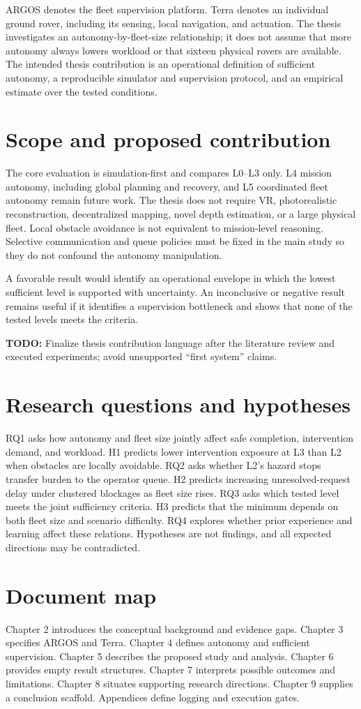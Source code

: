 \documentclass[12pt,oneside]{report}
\newcommand{\todo}[1]{\par\noindent\textcolor{red!65!black}{\textbf{TODO:} #1}\par}
\begin{document}
ARGOS denotes the fleet supervision platform. Terra denotes an individual ground rover, including its sensing, local navigation, and actuation. The thesis investigates an autonomy-by-fleet-size relationship; it does not assume that more autonomy always lowers workload or that sixteen physical rovers are available. The intended thesis contribution is an operational definition of sufficient autonomy, a reproducible simulator and supervision protocol, and an empirical estimate over the tested conditions.
\section{Scope and proposed contribution}
The core evaluation is simulation-first and compares L0--L3 only. L4 mission autonomy, including global planning and recovery, and L5 coordinated fleet autonomy remain future work. The thesis does not require VR, photorealistic reconstruction, decentralized mapping, novel depth estimation, or a large physical fleet. Local obstacle avoidance is not equivalent to mission-level reasoning. Selective communication and queue policies must be fixed in the main study so they do not confound the autonomy manipulation.

A favorable result would identify an operational envelope in which the lowest sufficient level is supported with uncertainty. An inconclusive or negative result remains useful if it identifies a supervision bottleneck and shows that none of the tested levels meets the criteria. \todo{Finalize thesis contribution language after the literature review and executed experiments; avoid unsupported ``first system'' claims.}
\section{Research questions and hypotheses}
RQ1 asks how autonomy and fleet size jointly affect safe completion, intervention demand, and workload. H1 predicts lower intervention exposure at L3 than L2 when obstacles are locally avoidable. RQ2 asks whether L2's hazard stops transfer burden to the operator queue. H2 predicts increasing unresolved-request delay under clustered blockages as fleet size rises. RQ3 asks which tested level meets the joint sufficiency criteria. H3 predicts that the minimum depends on both fleet size and scenario difficulty. RQ4 explores whether prior experience and learning affect these relations. Hypotheses are not findings, and all expected directions may be contradicted.
\section{Document map}
Chapter 2 introduces the conceptual background and evidence gaps. Chapter 3 specifies ARGOS and Terra. Chapter 4 defines autonomy and sufficient supervision. Chapter 5 describes the proposed study and analysis. Chapter 6 provides empty result structures. Chapter 7 interprets possible outcomes and limitations. Chapter 8 situates supporting research directions. Chapter 9 supplies a conclusion scaffold. Appendices define logging and execution gates.
\end{document}
